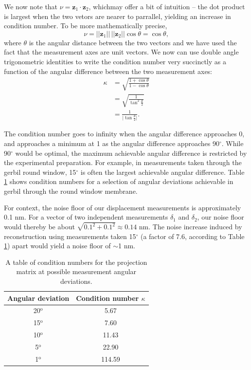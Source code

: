 \documentclass[preprint,NumberedRefs]{JASA}
\begin{document}
\par{We now note that $\nu = \mathbf{z}_1\cdot\mathbf{z}_2$, whichmay offer a bit of intuition -- the dot product is largest when the two vetors are nearer to parrallel, yielding an increase in condition number. To be more mathematically precise,
	\begin{equation}
		\nu = ||\mathbf{z}_1||\,||\mathbf{z}_2||\cos{\theta} = \cos{\theta},
	\end{equation}
where $\theta$ is the angular distance between the two vectors and we have used the fact that the measurement axes are unit vectors. We now can use double angle trigonometric identities to write the condition number very succinctly as a function of the angular difference between the two measurement axes:
	\begin{align}
		\kappa &= \sqrt{\frac{1+\cos\theta}{1-\cos\theta}}\\
			   &=\sqrt{\frac{1}{\tan^2\frac{\theta}{2}}}\\
			   &=\frac{1}{\big|\tan\frac{\theta}{2}\big|}.
	\end{align}
}
\par{The condition number goes to infinity when the angular difference approaches 0, and approaches a minimum at 1 as the angular difference approaches 90$^\circ$. While 90$^\circ$ would be optimal, the maximum achievable angular difference is restricted by the experimental preparation. For example, in measurements taken through the gerbil round window, 15$^\circ$ is often the largest achievable angular difference. Table \ref{kappas} shows condition numbers for a selection of angular deviations achievable in gerbil through the round window membrane.}
\par{For context, the noise floor of our displacement measurements is approximately 0.1 nm. For a vector of two independent measurements $\delta_1$ and $\delta_2$, our noise floor would thereby be about $\sqrt{0.1^2 + 0.1^2}\approx0.14$ nm. The noise increase induced by reconstruction using measurements taken 15$^\circ$ (a factor of 7.6, according to Table \ref{kappas}) apart would yield a noise floor of $\sim$1 nm.}

\begin{table}
\begin{center}
	\begin{tabular}{|c|c|}
        \hline
        Angular deviation & Condition number $\kappa$ \\
        \hline
		20$^\text{o}$ & 5.67\\
        15$^\text{o}$ & 7.60\\
        10$^\text{o}$ & 11.43\\
        5$^\text{o}$ & 22.90 \\
        1$^\text{o}$ & 114.59\\
        \hline
    \end{tabular}
    \caption{A table of condition numbers for the projection matrix at possible measurement angular deviations.}
\label{kappas}
\end{center}
\end{table}
\end{document}
